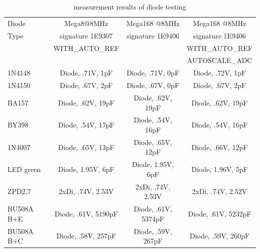 \begin{table}[H]
  \begin{center}
    \begin{tabular}{| l | c | c | c |}
    \hline
     Diode & Mega8@8MHz & Mega168 @8MHz & Mega168 @8MHz \\
     Type  & signature 1E9307 & signature 1E9406 & signature 1E9406 \\
           & WITH\_AUTO\_REF &  & WITH\_AUTO\_REF \\
           &                 &  & AUTOSCALE\_ADC \\
    \hline
    \hline
1N4148 & Diode, .71V, 1pF & Diode, .71V, 0pF & Diode, .72V, 1pF\\
    \hline
1N4150 & Diode, .67V, 2pF & Diode, .67V, 0pF & Diode, .67V, 2pF\\
    \hline
BA157 & Diode, .62V, 19pF & Diode, .62V, 19pF & Diode, .62V, 19pF\\
    \hline
BY398 & Diode, .54V, 17pF & Diode, .54V, 16pF & Diode, .54V, 16pF\\
    \hline
1N4007 & Diode, .65V, 13pF & Diode, .65V, 12pF & Diode, .66V, 12pF\\
    \hline
LED green & Diode, 1.95V, 6pF & Diode, 1.95V, 6pF & Diode, 1.96V, 5pF\\
    \hline
ZPD2,7 & 2xDi, .74V, 2.53V & 2xDi, .74V, 2.53V & 2xDi, .74V, 2.52V \\
    \hline
BU508A B+E & Diode, .61V, 5190pF & Diode, .61V, 5374pF & Diode, .61V, 5232pF\\
    \hline
BU508A B+C & Diode, .58V, 257pF & Diode, .59V, 267pF & Diode, .59V, 260pF\\
    \hline
    \end{tabular}
  \end{center}
  \caption{measurement results of diode testing}
  \label{tab:diodes} 
\end{table}

